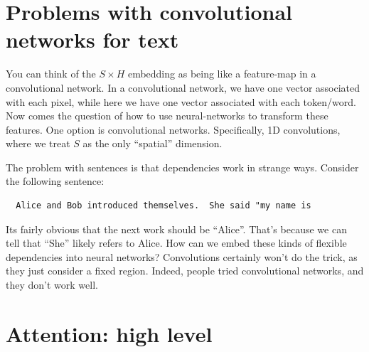 \documentclass{article}
\begin{document}
\section{Problems with convolutional networks for text}

You can think of the $S \times H$ embedding as being like a feature-map in a convolutional network.
In a convolutional network, we have one vector associated with each pixel, while here we have one vector associated with each token/word.
Now comes the question of how to use neural-networks to transform these features.
One option is convolutional networks.
Specifically, 1D convolutions, where we treat $S$ as the only ``spatial'' dimension.

The problem with sentences is that dependencies work in strange ways.
Consider the following sentence:
\begin{verbatim}
  Alice and Bob introduced themselves.  She said "my name is
\end{verbatim}
Its fairly obvious that the next work should be ``Alice''.
That's because we can tell that ``She'' likely refers to Alice.
How can we embed these kinds of flexible dependencies into neural networks?
Convolutions certainly won't do the trick, as they just consider a fixed region.
Indeed, people tried convolutional networks, and they don't work well.

\section{Attention: high level}
\end{document}
